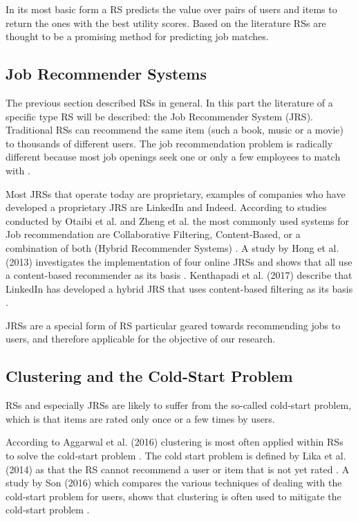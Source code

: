 In its most basic form a RS predicts the value over pairs of users and items to return the ones with the best utility scores.
Based on the literature RSs are thought to be a promising method for predicting job matches.

\subsection{Job Recommender Systems}
\label{sec:jrs}
The previous section described RSs in general. 
In this part the literature of a specific type RS will be described: the Job Recommender System (JRS).
Traditional RSs can recommend the same item (such a book, music or a movie) to thousands of different users. 
The job recommendation problem is radically different because most job openings seek one or only a few employees to match with \cite{kenthapadi2017personalized}.

Most JRSs that operate today are proprietary, examples of companies who have developed a proprietary JRS are LinkedIn and Indeed.
According to studies conducted by Otaibi et al. and Zheng et al. the most commonly used  systems for Job recommendation are Collaborative Filtering, Content-Based, or a combination of both (Hybrid Recommender Systems) \cite{T.Al-Otaibi2012ASystems, Zheng2012JobSurvey}.
A study by Hong et al. (2013) investigates the implementation of four online JRSs and shows that all use a content-based recommender as its basis \cite{hong2013job}.
Kenthapadi et al. (2017) describe that LinkedIn has developed a hybrid JRS that uses content-based filtering as its basis \cite{kenthapadi2017personalized}.

JRSs are a special form of RS particular geared towards recommending jobs to users, and therefore applicable for the objective of our research. 

\subsection{Clustering and the Cold-Start Problem}
\label{sec:ccs}
RSs and especially JRSs are likely to suffer from the so-called cold-start problem, which is that items are rated only once or a few times by users.

According to Aggarwal et al. (2016) clustering is most often applied within RSs to solve the cold-start problem \cite{aggarwal2016recommender}.
The cold start problem is defined by Lika et al. (2014) as that the RS cannot recommend a user or item that is not yet rated \cite{lika2014facing}.
A study by Son (2016) which compares the various techniques of dealing with the cold-start problem for users, shows that clustering is often used to mitigate the cold-start problem \cite{son2016dealing}.


